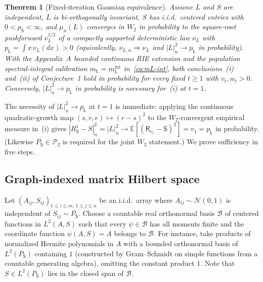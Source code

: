 \documentclass[11pt]{article}
\theoremstyle{plain}
\newtheorem{theorem}{Theorem}
\theoremstyle{definition}
\theoremstyle{remark}
\newcommand{\E}{\mathbb{E}}
\newcommand{\sL}{\mathsf{L}}
\newcommand{\sS}{\mathsf{S}}
\newcommand{\sR}{\mathsf{R}}
\begin{document}
\begin{theorem}[Fixed-iteration Gaussian equivalence]\label{thm:main}
Assume $L$ and $S$ are independent, $L$ is bi-orthogonally invariant, $S$ has i.i.d.\ centered entries with $0 < p_{\sS} < \infty$, and $\mu_n(L)$ converges in $W_2$ in probability to the square-root pushforward $\nu_L^{1/2}$ of a compactly supported deterministic law $\nu_L$ with $p_{\sL} = \int x\,\nu_L(dx) > 0$ (equivalently, $\nu_{L,n} \Rightarrow \nu_L$ and $|L|_n^2 \to p_{\sL}$ in probability).
With the Appendix~A bounded continuous RIE extension and the population spectral-integral calibration $m_{\sL} = m_{\sL}^{\mathrm{int}}$ in~\eqref{eq:mL-int}, both conclusions~\textup{(i)} and~\textup{(ii)} of Conjecture~1 hold in probability for every fixed $t \ge 1$ with $v_t, w_t > 0$.
Conversely, $|L|_n^2 \to p_{\sL}$ in probability is necessary for~\textup{(i)} at $t = 1$.
\end{theorem}

The necessity of $|L|_n^2 \to p_{\sL}$ at $t=1$ is immediate: applying the continuous quadratic-growth map $(s,r,e) \mapsto (r-s)^2$ to the $W_2$-convergent empirical measure in~(i) gives $|R_{\sS}^1 - S|_n^2 = |L|_n^2 \to \E[(\sR_{v_1} - \sS)^2] = v_1 = p_{\sL}$ in probability. (Likewise $P_{\sS} \in \mathcal{P}_2$ is required for the joint $W_2$ statement.)
We prove sufficiency in five steps.

\subsection{Graph-indexed matrix Hilbert space}

Let $(A_{ij}, S_{ij})_{1\le i\le m,\,1\le j\le n}$ be an i.i.d.\ array where $A_{ij} \sim \mathcal{N}(0,1)$ is independent of $S_{ij} \sim P_{\sS}$.
Choose a countable real orthonormal basis $\mathcal{B}$ of centered functions in $L^2(A, S)$ such that every $\psi \in \mathcal{B}$ has all moments finite and the coordinate function $\psi(A,S)=A$ belongs to $\mathcal{B}$.
For instance, take products of normalized Hermite polynomials in $A$ with a bounded orthonormal basis of $L^2(P_{\sS})$ containing $1$ (constructed by Gram--Schmidt on simple functions from a countable generating algebra), omitting the constant product $1$. Note that $S \in L^2(P_{\sS})$ lies in the closed span of $\mathcal{B}$.
\end{document}
